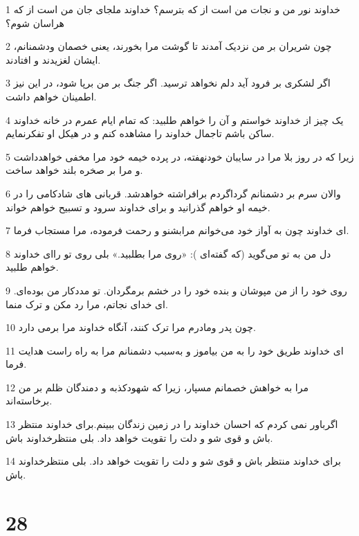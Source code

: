 \par 1 خداوند نور من و نجات من است از که بترسم؟ خداوند ملجای جان من است از که هراسان شوم؟
\par 2 چون شریران بر من نزدیک آمدند تا گوشت مرا بخورند، یعنی خصمان ودشمنانم، ایشان لغزیدند و افتادند.
\par 3 اگر لشکری بر فرود آید دلم نخواهد ترسید. اگر جنگ بر من برپا شود، در این نیز اطمینان خواهم داشت.
\par 4 یک چیز از خداوند خواستم و آن را خواهم طلبید: که تمام ایام عمرم در خانه خداوند ساکن باشم تاجمال خداوند را مشاهده کنم و در هیکل او تفکرنمایم.
\par 5 زیرا که در روز بلا مرا در سایبان خودنهفته، در پرده خیمه خود مرا مخفی خواهدداشت و مرا بر صخره بلند خواهد ساخت.
\par 6 والان سرم بر دشمنانم گرداگردم برافراشته خواهدشد. قربانی های شادکامی را در خیمه او خواهم گذرانید و برای خداوند سرود و تسبیح خواهم خواند.
\par 7 ‌ای خداوند چون به آواز خود می‌خوانم مرابشنو و رحمت فرموده، مرا مستجاب فرما.
\par 8 دل من به تو می‌گوید (که گفته‌ای ): «روی مرا بطلبید.» بلی روی تو را‌ای خداوند خواهم طلبید.
\par 9 روی خود را از من مپوشان و بنده خود را در خشم برمگردان. تو مددکار من بوده‌ای. ای خدای نجاتم، مرا رد مکن و ترک منما.
\par 10 چون پدر ومادرم مرا ترک کنند، آنگاه خداوند مرا برمی دارد.
\par 11 ‌ای خداوند طریق خود را به من بیاموز و به‌سبب دشمنانم مرا به راه راست هدایت فرما.
\par 12 مرا به خواهش خصمانم مسپار، زیرا که شهودکذبه و دمندگان ظلم بر من برخاسته‌اند.
\par 13 اگرباور نمی کردم که احسان خداوند را در زمین زندگان ببینم.برای خداوند منتظر باش و قوی شو و دلت را تقویت خواهد داد. بلی منتظرخداوند باش.
\par 14 برای خداوند منتظر باش و قوی شو و دلت را تقویت خواهد داد. بلی منتظرخداوند باش.
 
\chapter{28}

